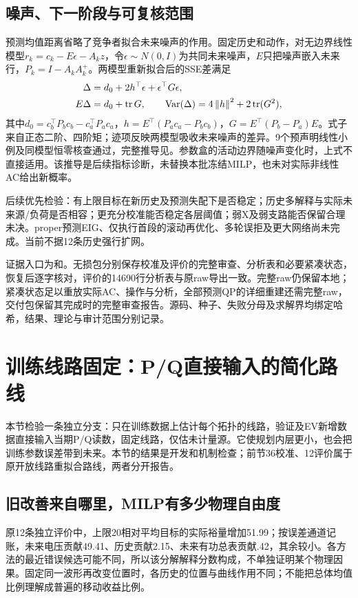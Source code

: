 \documentclass[UTF8,fontset=fandol,11pt,a4paper]{ctexart}
\newcommand{\norm}[1]{\left\lVert#1\right\rVert}
\begin{document}
\subsection{噪声、下一阶段与可复核范围}
预测均值距离省略了竞争者拟合未来噪声的作用。固定历史和动作，对无边界线性模型$r_k=c_k-E\epsilon-A_kz$，令$\epsilon\sim N(0,I)$为共同未来噪声，$E$只把噪声嵌入未来行，$P_k=I-A_kA_k^+$。两模型重新拟合后的SSE差满足
\begin{align}
 \Delta&=d_0+2h^\top\epsilon+\epsilon^\top G\epsilon,\notag\\
 E\Delta&=d_0+\operatorname{tr}G,\qquad
 \operatorname{Var}(\Delta)=4\norm{h}^2+2\operatorname{tr}(G^2),
 \label{eq:compact-noise-moments}
\end{align}
其中$d_0=c_b^\top P_bc_b-c_a^\top P_ac_a$，$h=E^\top(P_ac_a-P_bc_b)$，$G=E^\top(P_b-P_a)E$。式子来自正态二阶、四阶矩；迹项反映两模型吸收未来噪声的差异。9个预声明线性小例及同模型恒零核查通过，完整推导见。参数盒的活动边界随噪声变化时，上式不直接适用。该推导是后续指标诊断，未替换本批冻结MILP，也未对实际非线性AC给出新概率。

后续优先检验：有上限目标在新历史及预测失配下是否稳定；历史多解释与实际未来源/负荷是否相容；更充分校准能否稳定各层阈值；弱X及弱支路能否保留合理未决。proper预测EIG、仅执行首段的滚动再优化、多轮误拒及更大网络尚未完成。当前不据12条历史强行扩网。

证据入口为和。无损包分别保存校准及评价的完整审查、分析表和必要紧凑状态，恢复后逐字核对，评价的14690行分析表与原raw导出一致。完整raw仍保留本地；紧凑状态足以重放实际AC、操作与分析，全部预测QP的详细重建还需完整raw，交付包保留其完成时的完整审查报告。源码、种子、失败分母及求解界均绑定哈希，结果、理论与审计范围分别记录。






\section{训练线路固定：P/Q直接输入的简化路线}
\label{sec:fixed-train}
本节检验一条独立分支：只在训练数据上估计每个拓扑的线路，验证及EV新增数据直接输入当期P/Q读数，固定线路，仅估未计量源。它使规划内层更小，也会把训练参数误差带到未来。本节的结果是开发和机制检查；前节36校准、12评价属于原开放线路重拟合路线，两者分开报告。

\subsection{旧改善来自哪里，MILP有多少物理自由度}
原12条独立评价中，上限20相对平均目标的实际裕量增加51.99；按误差通道记账，未来电压贡献49.41、历史贡献2.15、未来有功总表贡献.42，其余较小。各方法的最近错误候选可能不同，所以该分解解释分数构成，不单独证明某个物理因果。固定同一波形再改变位置时，各历史的位置与曲线作用不同；不能把总体均值比例理解成普遍的移动收益比例。
\end{document}
